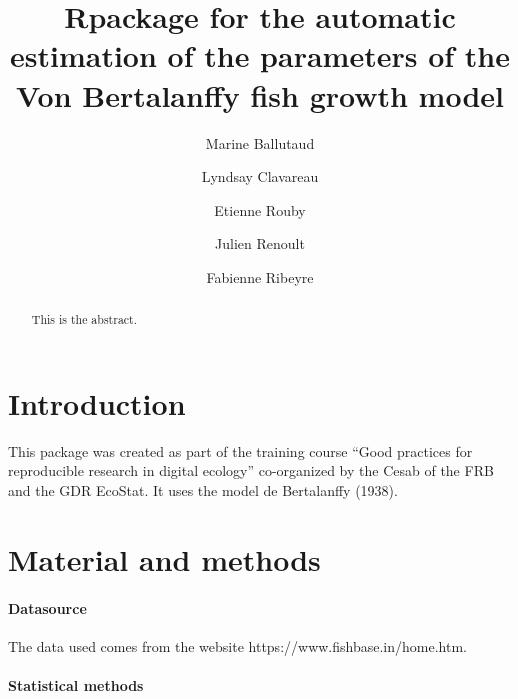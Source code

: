 \documentclass[]{elsarticle} %
\begin{document}
\begin{frontmatter}

  \title{Rpackage for the automatic estimation of the parameters of the Von
Bertalanffy fish growth model}
    \author[Université de Lille]{Marine Ballutaud}
    \author[IFREMER]{Lyndsay Clavareau}
    \author[Observatoire Pelagis]{Etienne Rouby}
    \author[Centre d'Ecologie Fonctionnelle et Evolutive]{Julien Renoult}
    \author[Cirad]{Fabienne Ribeyre}
      \address[Université de Lille]{Department, Street, City, State, Zip}
  
  \begin{abstract}
  This is the abstract.
  \end{abstract}
  
 \end{frontmatter}

\hypertarget{introduction}{%
\section{Introduction}\label{introduction}}

This package was created as part of the training course ``Good practices
for reproducible research in digital ecology'' co-organized by the Cesab
of the FRB and the GDR EcoStat. It uses the model de Bertalanffy (1938).

\hypertarget{material-and-methods}{%
\section{Material and methods}\label{material-and-methods}}

\hypertarget{datasource}{%
\paragraph{Datasource}\label{datasource}}

The data used comes from the website https://www.fishbase.in/home.htm.

\hypertarget{statistical-methods}{%
\paragraph{Statistical methods}\label{statistical-methods}}
\end{document}
